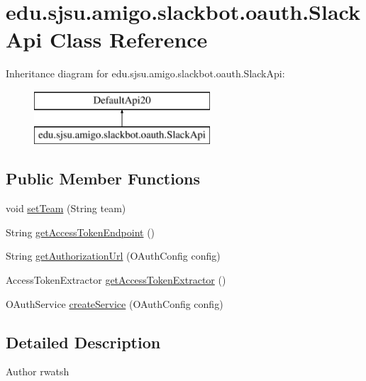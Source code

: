 \hypertarget{classedu_1_1sjsu_1_1amigo_1_1slackbot_1_1oauth_1_1_slack_api}{}\section{edu.\+sjsu.\+amigo.\+slackbot.\+oauth.\+Slack\+Api Class Reference}
\label{classedu_1_1sjsu_1_1amigo_1_1slackbot_1_1oauth_1_1_slack_api}
Inheritance diagram for edu.\+sjsu.\+amigo.\+slackbot.\+oauth.\+Slack\+Api\+:\begin{figure}[H]
\begin{center}
\leavevmode
\includegraphics[height=2.000000cm]{classedu_1_1sjsu_1_1amigo_1_1slackbot_1_1oauth_1_1_slack_api}
\end{center}
\end{figure}
\subsection*{Public Member Functions}
\begin{DoxyCompactItemize}
\item 
void \hyperlink{classedu_1_1sjsu_1_1amigo_1_1slackbot_1_1oauth_1_1_slack_api_a1e51b0d1ac9b016a697dcf20b3ebb0f1}{set\+Team} (String team)
\item 
String \hyperlink{classedu_1_1sjsu_1_1amigo_1_1slackbot_1_1oauth_1_1_slack_api_afed10b789b65167d0204b55b77e81583}{get\+Access\+Token\+Endpoint} ()
\item 
String \hyperlink{classedu_1_1sjsu_1_1amigo_1_1slackbot_1_1oauth_1_1_slack_api_a375d1715760f102118c36ceea87af5a3}{get\+Authorization\+Url} (O\+Auth\+Config config)
\item 
Access\+Token\+Extractor \hyperlink{classedu_1_1sjsu_1_1amigo_1_1slackbot_1_1oauth_1_1_slack_api_a79af3fa6963e6ac9fbe63e3736a59e78}{get\+Access\+Token\+Extractor} ()
\item 
O\+Auth\+Service \hyperlink{classedu_1_1sjsu_1_1amigo_1_1slackbot_1_1oauth_1_1_slack_api_aa14a981b6cb2eb9c641bf534699a7e4a}{create\+Service} (O\+Auth\+Config config)
\end{DoxyCompactItemize}


\subsection{Detailed Description}
\begin{DoxyAuthor}{Author}
rwatsh 
\end{DoxyAuthor}


